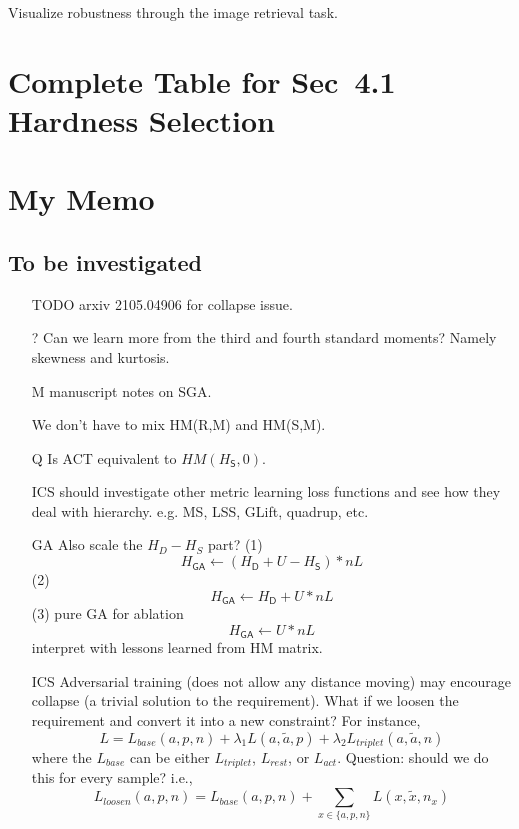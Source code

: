 Visualize robustness through the image retrieval task.

\section{Complete Table for Sec~4.1 Hardness Selection}

\section{My Memo}

\subsection{To be investigated}

\begin{itemize}

	\item [TODO] arxiv 2105.04906 for collapse issue.

	\item [?] Can we learn more from the third and fourth standard moments?
		Namely skewness and kurtosis.
	
	\item [M] manuscript notes on SGA.

	\item [\cmark] We don't have to mix HM(R,M) and HM(S,M).

	\item [Q] Is ACT equivalent to $HM(H_\mathsf{S},0)$.

	\item [ICS] should investigate other metric learning loss functions and see
		how they deal with hierarchy. e.g. MS, LSS, GLift, quadrup, etc.

	\item [GA] Also scale the $H_D-H_S$ part?
		(1) $$ H_\mathsf{GA} \leftarrow (H_\mathsf{D} + U - H_\mathsf{S}) * nL $$
		(2) $$ H_\mathsf{GA} \leftarrow H_\mathsf{D} + U * nL $$
		(3) pure GA for ablation $$ H_\mathsf{GA} \leftarrow U * nL $$
		interpret with lessons learned from HM matrix.

	\item [ICS] Adversarial training (does not allow any distance moving) may
		encourage collapse (a trivial solution to the requirement). What if we
		loosen the requirement and convert it into a new constraint? For
		instance, \[
			L=L_{base}(a,p,n)+\lambda_{1}L(a,\tilde{a},p)+\lambda_{2}L_{triplet}(a,\tilde{a},n)
		\] where the $L_{base}$ can be either $L_{triplet}$, $L_{rest}$, or
		$L_{act}$. Question: should we do this for every sample? i.e., \[
			L_{loosen}(a,p,n)=L_{base}(a,p,n)+\sum_{x\in\{a,p,n\}}L(x,\tilde{x},n_{x})
		\]


\end{itemize}
